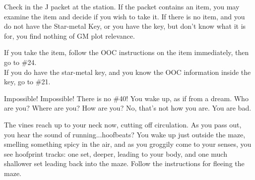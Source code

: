 \documentclass[green]{gl2018}
\begin{document}
\begin{LARGE}
\begin{location}{38}
\begin{fromhere}
\end{fromhere}
\end{location}
\begin{location}{39}
 Check in the J packet at the station.  If the packet contains an item, you may examine the item and decide if you wish to take it.  If there is no item, and you do not have the Star-metal Key, or you have the key, but don't know what it is for, you find nothing of GM plot relevance. 
\begin{fromhere}
If you take the item, follow the OOC instructions on the item immediately, then go to \#24.\\
If you do have the star-metal key, and you know the OOC information inside the key, go to \#21.
\end{fromhere}
\end{location}
\begin{location}{40}
Impossible!  Impossible!  There is no \#40!  You wake up, as if from a dream.  Who are you?  Where are you?  How are you?  No, that's not how you are.  You are bad.
\end{location}
\begin{location}{41}
The vines reach up to your neck now, cutting off circulation.  As you pass out, you hear the sound of running...hoofbeats?  You wake up just outside the maze, smelling something spicy in the air, and as you groggily come to your senses, you see hoofprint tracks: one set, deeper, leading to your body, and one much shallower set leading back into the maze.  Follow the instructions for fleeing the maze.
\end{location}
\end{LARGE}
\end{document}
